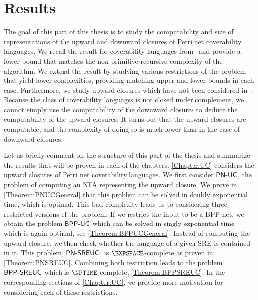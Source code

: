 \documentclass[../../diss.tex]{subfiles}
\begin{document}
\section{Results}%
\label{Section:PNResults}%

The goal of this part of this thesis is to study the computability and size of representations of the upward and downward closures of Petri net coverability languages.
We recall the result for coverability languages from~\cite{HabermehlMW10} and provide a lower bound that matches the non-primitive recursive complexity of the algorithm.
We extend the result by studying various restrictions of the problem that yield lower complexities, providing matching upper and lower bounds in each case.
Furthermore, we study upward closures which have not been considered in~\cite{HabermehlMW10}.
Because the class of coverability languages is not closed under complement, we cannot simply use the computability of the downward closures to deduce the computability of the upward closures.
It turns out that the upward closures are computable, and the complexity of doing so is much lower than in the case of downward closures.

Let us briefly comment on the structure of this part of the thesis and summarize the results that will be proven in each of the chapters.
\cref{Chapter:UC} considers the upward closures of Petri net coverability languages.
We first consider $\mathsf{PN\text{-}UC}$, the problem of computing an NFA representing the upward closure.
We prove in \cref{Theorem:PNUCGeneral} that this problem can be solved in doubly exponential time, which is optimal.
This bad complexity leads us to considering three restricted versions of the problem:
If we restrict the input to be a BPP net, we obtain the problem $\mathsf{BPP\text{-}UC}$ which can be solved in singly exponential time which is again optimal, see \cref{Theorem:BPPUCGeneral}.
Instead of computing the upward closure, we then check whether the language of a given SRE is contained in it.
This problem, $\mathsf{PN\text{-}SREUC}$, is $\EXPSPACE$-complete as proven in \cref{Theorem:PNSREUC}.
Combining both restriction leads to the problem $\mathsf{BPP\text{-}SREUC}$ which is $\NPTIME$-complete, \cref{Theorem:BPPSREUC}.
In the corresponding sections of \cref{Chapter:UC}, we provide more motivation for considering each of these restrictions.
\end{document}
